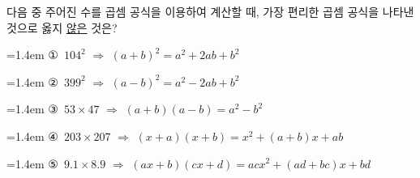 다음 중 주어진 수를 곱셈 공식을 이용하여 계산할 때, 가장 편리한 곱셈 공식을 나타낸 것으로 옳지 \underline{않은} 것은?
\par\medskip\par\noindent\hangindent=1.4em {\small ①}\ $104^2$ $\Rightarrow$ $(a+b)^2=a^2+2ab+b^2$\par\noindent\hangindent=1.4em {\small ②}\ $399^2$ $\Rightarrow$ $(a-b)^2=a^2-2ab+b^2$\par\noindent\hangindent=1.4em {\small ③}\ $53\times47$ $\Rightarrow$ $(a+b)(a-b)=a^2-b^2$\par\noindent\hangindent=1.4em {\small ④}\ $203\times207$ $\Rightarrow$ $(x+a)(x+b)=x^2+(a+b)x+ab$\par\noindent\hangindent=1.4em {\small ⑤}\ $9.1\times8.9$ $\Rightarrow$ $(ax+b)(cx+d)=acx^2+(ad+bc)x+bd$\par\medskip
